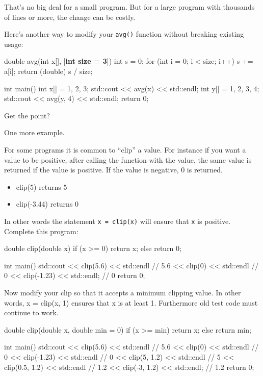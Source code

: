 That's no big deal for a small program. But for a large program with thousands of lines or more, the change can be costly.

Here's another way to modify your \texttt{avg()} function without breaking existing usage:

\begin{consolethree}[escapeinside=||]
double avg(int x[], |\textbf{int size = 3}|)
{
    int s = 0;
    for (int i = 0; i < size; i++)
    {
        s += a[i];
    }
    return (double) s / size;
}

int main()
{
    int x[] = {1, 2, 3};
    std::cout << avg(x) << std::endl;
    int y[] = {1, 2, 3, 4};
    std::cout << avg(y, 4) << std::endl;
    return 0;
}
\end{consolethree}

Get the point?

One more example.

For some programs it is common to ``clip'' a value. For instance if you want a value to be positive, after calling the function with the value, the same value is returned if the value is positive. If the value is negative, 0 is returned.

\begin{itemize}
\item clip(5) returns 5
\item clip(-3.44) returns 0
\end{itemize}

In other words the statement \texttt{x = clip(x)} will ensure that
\texttt{x} is positive. Complete this program:

\begin{consolethree}[escapeinside=||]
double clip(double x)
{
    if (x >= 0)
        return x;
    else
        return 0;
}

int main()
{
    std::cout << clip(5.6) << std::endl   // 5.6
              << clip(0) << std::endl     // 0
              << clip(-1.23) << std::endl; // 0
    return 0;
}
\end{consolethree}

Now modify your clip so that it accepts a minimum clipping value. In other words, x = clip(x, 1) ensures that x is at least 1. Furthermore old test code must continue to work.

\begin{consolethree}[escapeinside=||]
double clip(double x, double min = 0)
{
    if (x >= min)
        return x;
    else
        return min;
}

int main()
{
    std::cout << clip(5.6) << std::endl      // 5.6
              << clip(0) << std::endl        // 0
              << clip(-1.23) << std::endl    // 0
              << clip(5, 1.2) << std::endl   // 5
              << clip(0.5, 1.2) << std::endl // 1.2
              << clip(-3, 1.2) << std::endl; // 1.2
    return 0;
}
\end{consolethree}

